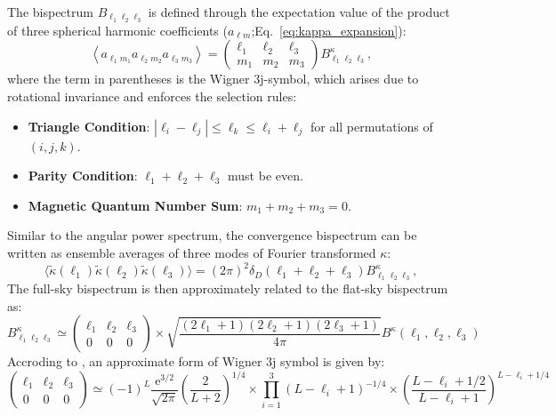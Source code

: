 The bispectrum $B_{\ell_1 \ell_2 \ell_3}$ is defined through the expectation value of the product of three spherical harmonic coefficients  ($a_{\ell m}$;Eq.~\ref{eq:kappa_expansion}):
\begin{equation}
    \left\langle a_{\ell_1 m_1} a_{\ell_2 m_2} a_{\ell_3 m_3} \right\rangle = \begin{pmatrix} 
            \ell_1 & \ell_2 & \ell_3 \\ 
            m_1 & m_2 & m_3 
        \end{pmatrix} B^\kappa_{\ell_1 \ell_2 \ell_3},
\end{equation}
where the term in parentheses is the Wigner 3j-symbol, which arises due to rotational invariance and enforces the selection rules:
\begin{itemize}
    \item \textbf{Triangle Condition}: $|\ell_i - \ell_j| \leq \ell_k \leq \ell_i + \ell_j$ for all permutations of $(i, j, k)$.
    \item \textbf{Parity Condition}: $\ell_1 + \ell_2 + \ell_3$ must be even.
    \item \textbf{Magnetic Quantum Number Sum}: $m_1 + m_2 + m_3 = 0$.
\end{itemize}
Similar to the angular power spectrum, the convergence bispectrum can be written as ensemble averages of three modes of Fourier transformed $\kappa$:
\begin{equation}
    \langle \tilde{\kappa}(\mathbf{\ell}_1) \tilde{\kappa}(\mathbf{\ell}_2) \tilde{\kappa}(\mathbf{\ell}_3) \rangle = (2\pi)^2 \delta_{D}(\mathbf{\ell}_1 + \mathbf{\ell}_2 + \mathbf{\ell}_3) B^\kappa_{\ell_1 \ell_2 \ell_3},
\end{equation}
The full-sky bispectrum is then approximately related to the flat-sky bispectrum as:
\begin{equation}
    B_{\ell_1 \ell_2 \ell_3}^\kappa \simeq\left(\begin{array}{ccc}
        \ell_1 & \ell_2 & \ell_3 \\
        0 & 0 & 0
        \end{array}\right) \times \sqrt{\frac{\left(2 \ell_1+1\right)\left(2 \ell_2+1\right)\left(2 \ell_3+1\right)}{4 \pi}}  B^\kappa\left(\ell_1, \ell_2, \ell_3\right)
\end{equation}
Accroding to \citet{2004MNRAS.348..897T}, an approximate form of Wigner 3j symbol is given by:
\begin{equation}
    \left(\begin{array}{ccc}
        \ell_1 & \ell_2 & \ell_3 \\
        0 & 0 & 0
        \end{array}\right) \simeq(-1)^L \frac{\mathrm{e}^{3/2}}{\sqrt{2 \pi}}\left(\frac{2}{L+2}\right)^{1 / 4} \times \prod_{i=1}^3\left(L-\ell_i+1\right)^{-1 / 4} \times\left(\frac{L-\ell_i+1 / 2}{L-\ell_i+1}\right)^{L-\ell_i+1 / 4}
\end{equation}

